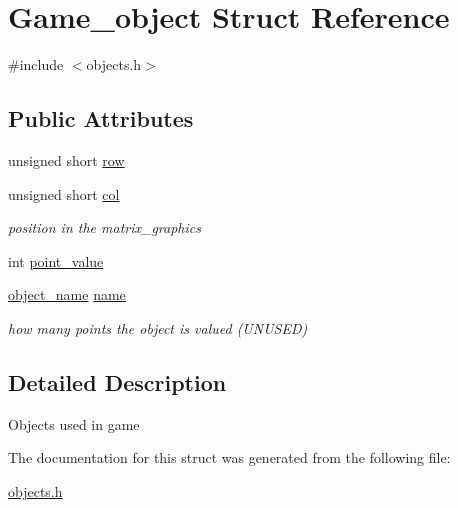 \hypertarget{structGame__object}{}\section{Game\+\_\+object Struct Reference}
\label{structGame__object}


{\ttfamily \#include $<$objects.\+h$>$}

\subsection*{Public Attributes}
\begin{DoxyCompactItemize}
\item 
unsigned short \hyperlink{group__object_ga41a0b70059db5a8364cb00caed5f7860}{row}
\item 
unsigned short \hyperlink{group__object_ga26747c58af9aac0a386f3be5b5302d23}{col}
\begin{DoxyCompactList}\small\item\em position in the matrix\+\_\+graphics \end{DoxyCompactList}\item 
int \hyperlink{group__object_gaa3e8af9c364161ddf47359bba651e9cf}{point\+\_\+value}
\item 
\hyperlink{group__object_ga90ab20efa1890ce46e743d7569ce7cec}{object\+\_\+name} \hyperlink{group__object_ga27d8ddc2e36ab28af25f9698f1b11e49}{name}
\begin{DoxyCompactList}\small\item\em how many points the object is valued (U\+N\+U\+S\+ED) \end{DoxyCompactList}\end{DoxyCompactItemize}


\subsection{Detailed Description}
Objects used in game 

The documentation for this struct was generated from the following file\+:\begin{DoxyCompactItemize}
\item 
\hyperlink{objects_8h}{objects.\+h}\end{DoxyCompactItemize}
